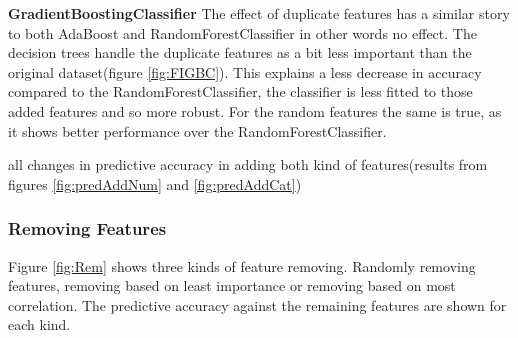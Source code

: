 \documentclass[a4paper,10pt]{article}
\begin{document}
\textbf{GradientBoostingClassifier} The effect of duplicate features has a similar story to both AdaBoost and RandomForestClassifier in other words no effect. The decision trees handle the duplicate features as a bit less important than the original dataset(figure \ref{fig:FIGBC}). This explains a less decrease in accuracy compared to the RandomForestClassifier, the classifier is less fitted to those added features and so more robust. For the random features the same is true, as it shows better performance over the RandomForestClassifier. \\

\begin{table}[h]
	\centering
	\caption{all changes in predictive accuracy in adding both kind of features(results from figures \ref{fig:predAddNum} and \ref{fig:predAddCat})}\label{table:fluc}
\end{table}
\newpage

\subsubsection{Removing Features}
Figure \ref{fig:Rem} shows three kinds of feature removing. Randomly removing features, removing based on least importance or removing based on most correlation. The predictive accuracy against the remaining features are shown for each kind. 
\end{document}
